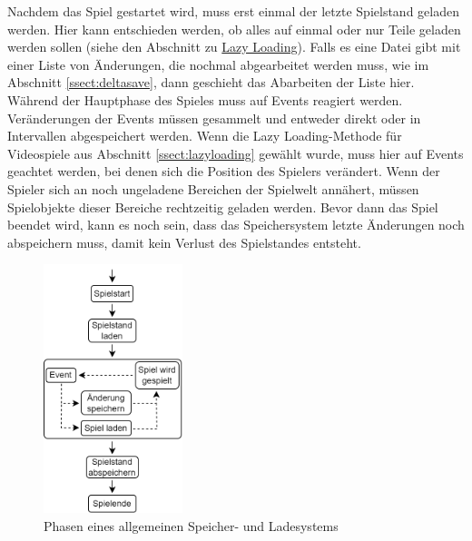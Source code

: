 Nachdem das Spiel gestartet wird, muss erst einmal der letzte Spielstand geladen werden. Hier kann entschieden werden, ob alles auf einmal oder nur Teile geladen werden sollen (siehe den Abschnitt zu \hyperref[ssect:lazyloading]{Lazy Loading}). Falls es eine Datei gibt mit einer Liste von Änderungen, die nochmal abgearbeitet werden muss, wie im Abschnitt \ref{ssect:deltasave}, dann geschieht das Abarbeiten der Liste hier. Während der Hauptphase des Spieles muss auf Events reagiert werden. Veränderungen der Events müssen gesammelt und entweder direkt oder in Intervallen abgespeichert werden. Wenn die Lazy Loading-Methode für Videospiele aus Abschnitt \ref{ssect:lazyloading} gewählt wurde, muss hier auf Events geachtet werden, bei denen sich die Position des Spielers verändert. Wenn der Spieler sich an noch ungeladene Bereichen der Spielwelt annähert, müssen Spielobjekte dieser Bereiche rechtzeitig geladen werden. Bevor dann das Spiel beendet wird, kann es noch sein, dass das Speichersystem letzte Änderungen noch abspeichern muss, damit kein Verlust des Spielstandes entsteht.

\begin{figure}[htp]
    \centering
    \includegraphics[width=0.36\textwidth]{images/Speichersystem.png}
    \caption{Phasen eines allgemeinen Speicher- und Ladesystems}
    \label{fig:speicherphasen}
\end{figure}

